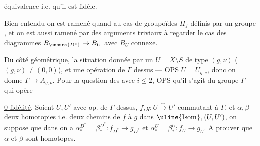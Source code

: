 
équivalence  i.e. qu'il est  fidèle.

Bien entendu on est ramené quand  au cas de groupoïdes  \(\Pi_f\) définis par un groupe , et on est aussi ramené par des arguments  triviaux à regarder le cas des diagrammes \(B_{\unsure{D^*}}\to B_U\) avec \(B_U\) connexe.

Du côté géométrique, la situation  donnée par un \(U=X\setminus S\) de type \((g,\nu)\) (\((g,\nu)\ne(0,0)\)), et une opération de \(\Gamma\) dessus --- OPS \(U=U_{g,\nu}\), donc on donne \(\Gamma\to A_{g,\nu}\). Pour la question des  avec \(i\leq 2\), OPS qu'il s'agit du  groupe \(\Gamma\) qui opère\unsure{;} 

 \uline{0-fidélité}.  Soient \(U,U'\) avec op. de \(\Gamma\) dessus, \(f,g:U\stackrel{\sim}{\longrightarrow}U'\) commutant à \(\Gamma\), et \(\alpha,\beta\) deux homotopies  i.e. deux chemins de \(f\) à \(g\) dans \(\uline{\mathrm{Isom}}_\Gamma(U,U')\), on suppose que dans 
on a \(\alpha_*^{D^*}=\beta_*^{D^*}:f_{D^*}\to g_{D^*}\) et \(\alpha_*^U=\beta_*^U:f_U\to g_U\). A prouver que \(\alpha\) et \(\beta\) sont homotopes.



